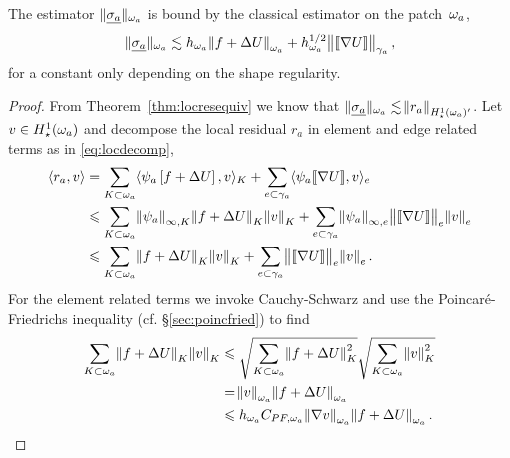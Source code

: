\documentclass[thesis.tex]{subfiles}
\begin{document}
  \begin{lem}
  The estimator $\| \underline{\sigma_a} \|_{\omega_a}$ is bound by the classical estimator on the patch~$\omega_a$, 
  \[
    \| \underline{\sigma_a} \|_{\omega_a} \lesssim h_{\omega_a}\norm{f + \Delta U}_{\omega_a} + h^{1/2}_{\omega_a} \norm{\llbracket \nabla U  \rrbracket}_{\gamma_a},
  \]
  for a constant only depending on the shape regularity.
  \end{lem}
  \begin{proof}
  From Theorem~\ref{thm:locresequiv} we know that $\| \underline{\sigma_a} \|_{\omega_a} \lesssim \norm{r_a}_{H_\star^1(\omega_a)'}$.
  Let $v \in H_\star^1(\omega_a)$ and decompose the local residual $r_a$ in element and edge related terms as in \eqref{eq:locdecomp},
  \begin{equation}
    \label{eq:locresupper}
  \begin{aligned}
    \langle r_a, v \rangle &= \sum_{K \subset \omega_a} \langle \psi_a\left[f + \Delta U\right], v \rangle_{K} + \sum_{e \subset \gamma_a} \langle \psi_a \llbracket \nabla U \rrbracket, v \rangle_e\\
    &\leqslant \sum_{K \subset \omega_a} \norm{\psi_a}_{\infty,K} \norm{f + \Delta U}_{K}\norm{v}_{K} + \sum_{e \subset \gamma_a} \norm{\psi_a}_{\infty, e} \norm{ \llbracket \nabla U \rrbracket}_e \norm{v}_e\\
    &\leqslant \sum_{K \subset \omega_a} \norm{f + \Delta U}_{K}\norm{v}_{K} + \sum_{e \subset \gamma_a} \norm{ \llbracket \nabla U \rrbracket}_e \norm{v}_e.
  \end{aligned}
\end{equation}
  For the element related terms we invoke Cauchy-Schwarz and use the
  Poincar\'e-Friedrichs inequality (cf. \S\ref{sec:poincfried}) to find
  \begin{align*}
    \sum_{K \subset \omega_a} \norm{f + \Delta U}_{K} \norm{v}_K &\leqslant \sqrt{\sum_{K \subset \omega_a} \norm{f + \Delta U}^2_K}\sqrt{\sum_{K \subset \omega_a} \norm{v}^2_K} \\
    &= \norm{v}_{\omega_a} \norm{f + \Delta U}_{\omega_a} \\
    &\leqslant h_{\omega_a} C_{PF,\omega_a} \norm{\nabla v}_{\omega_a} \norm{f + \Delta U}_{\omega_a}.
  \end{align*}


\end{proof}
\end{document}
